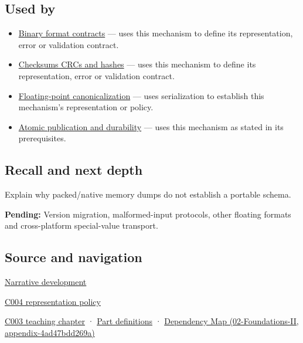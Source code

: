 \subsection{Used by}\label{appendix-91d09ebed979-used-by}

\begin{itemize}
\item
  \hyperref[appendix-590bbb2424c1]{Binary format contracts} --- uses this mechanism to define its representation, error or validation contract.
\item
  \hyperref[appendix-ed338677de0a]{Checksums CRCs and hashes} --- uses this mechanism to define its representation, error or validation contract.
\item
  \hyperref[appendix-e90053a4b201]{Floating-point canonicalization} --- uses serialization to establish this mechanism's representation or policy.
\item
  \hyperref[appendix-e89a8f290ef5]{Atomic publication and durability} --- uses this mechanism as stated in its prerequisites.
\end{itemize}

\subsection{Recall and next depth}\label{appendix-91d09ebed979-recall-and-next-depth}

Explain why packed/native memory dumps do not establish a portable schema.

\textbf{Pending:} Version migration, malformed-input protocols, other floating formats and cross-platform special-value transport.

\subsection{Source and navigation}\label{appendix-91d09ebed979-source-and-navigation}

\hyperref[01-foundations-i-ch002-bytes-become-a-durable-agreement]{Narrative development}

\hyperref[01-foundations-i-ch001-a-stretching-ruler-for-real-valued-quantities]{C004 representation policy}

\hyperref[01-foundations-i-ch002-where-the-bytes-live]{C003 teaching chapter} · \hyperref[appendix-fd090d982a15-m003---parts-41-60]{Part definitions} · \href{../02-Foundations-II/main.pdf\#nameddest=appendix-4ad47bdd269a}{Dependency Map (02-Foundations-II, appendix-4ad47bdd269a)}
